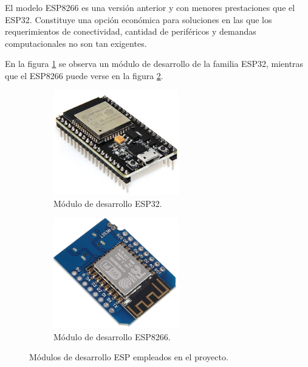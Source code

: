 
El modelo ESP8266 es una versión anterior y con menores prestaciones que el ESP32. Constituye una opción económica para soluciones en las que los requerimientos de conectividad, cantidad de periféricos y demandas computacionales no son tan exigentes.

En la figura \ref{fig:esp32} se observa un módulo de desarrollo de la familia ESP32, mientras que el ESP8266 puede verse en la figura \ref{fig:esp8266}. 


\begin{figure}[!htpb]
     \centering
     \begin{subfigure}[b]{0.45\textwidth}
		\centering
		\includegraphics[width=0.60\textwidth]{./Figures/esp32.jpg}
		\caption[Módulo de desarrollo ESP32]{Módulo de desarrollo ESP32.}
		\label{fig:esp32}
     \end{subfigure}
     \hfill
     \begin{subfigure}[b]{0.45\textwidth}
	\centering
		\includegraphics[width=0.60\textwidth]{./Figures/esp8266_2.jpg}
		\caption[Módulo de desarrollo ESP8266]{Módulo de desarrollo ESP8266.}
		\label{fig:esp8266}
     \end{subfigure}
     \hfill
        \caption[Módulos de desarrollo ESP empleados en el proyecto]{Módulos de desarrollo ESP empleados en el proyecto.}
        \label{fig:microESP}
\end{figure}





